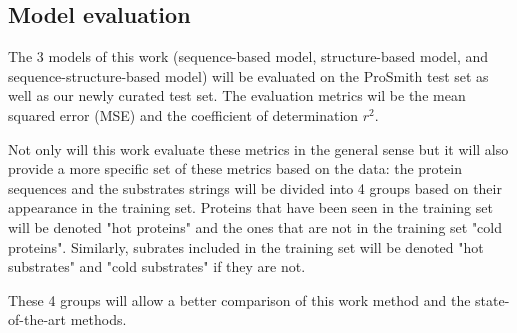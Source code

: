 \subsection{Model evaluation}
The 3 models of this work (sequence-based model, structure-based model, and sequence-structure-based model)
will be evaluated on the ProSmith test set as well as our newly curated test set. The evaluation metrics 
wil be the mean squared error (MSE) and the coefficient of determination $r^2$.

Not only will this work evaluate these metrics in the general sense but it will also provide a more specific
set of these metrics based on the data: the protein sequences and the substrates strings will be divided into
4 groups based on their appearance in the training set. Proteins that have been seen in the training set
will be denoted "hot proteins" and the ones that are not in the training set "cold proteins". Similarly, 
subrates included in the training set will be denoted "hot substrates" and "cold substrates" if they
are not.

These 4 groups will allow a better comparison of this work method and the state-of-the-art methods.

